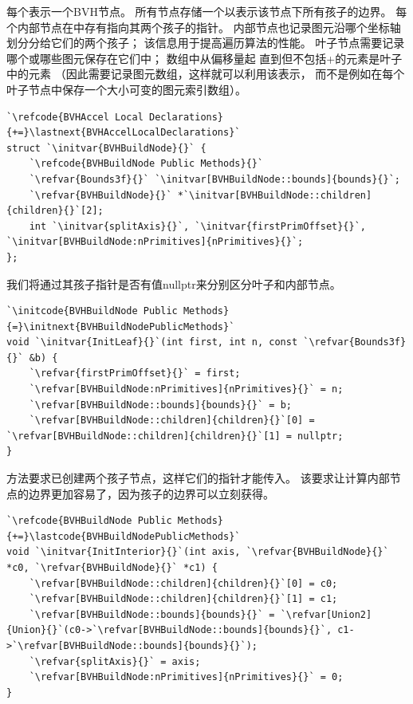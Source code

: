 每个表示一个BVH节点。
所有节点存储一个以表示该节点下所有孩子的边界。
每个内部节点在中存有指向其两个孩子的指针。
内部节点也记录图元沿哪个坐标轴划分分给它们的两个孩子；
该信息用于提高遍历算法的性能。
叶子节点需要记录哪个或哪些图元保存在它们中；
数组中从偏移量起
直到但不包括{\ttfamily{}+}的元素是叶子中的元素
（因此需要记录图元数组，这样就可以利用该表示，
而不是例如在每个叶子节点中保存一个大小可变的图元索引数组）。
\begin{lstlisting}
`\refcode{BVHAccel Local Declarations}{+=}\lastnext{BVHAccelLocalDeclarations}`
struct `\initvar{BVHBuildNode}{}` {
    `\refcode{BVHBuildNode Public Methods}{}`
    `\refvar{Bounds3f}{}` `\initvar[BVHBuildNode::bounds]{bounds}{}`;
    `\refvar{BVHBuildNode}{}` *`\initvar[BVHBuildNode::children]{children}{}`[2];
    int `\initvar{splitAxis}{}`, `\initvar{firstPrimOffset}{}`, `\initvar[BVHBuildNode:nPrimitives]{nPrimitives}{}`;
};
\end{lstlisting}

我们将通过其孩子指针是否有值{\ttfamily nullptr}来分别区分叶子和内部节点。
\begin{lstlisting}
`\initcode{BVHBuildNode Public Methods}{=}\initnext{BVHBuildNodePublicMethods}`
void `\initvar{InitLeaf}{}`(int first, int n, const `\refvar{Bounds3f}{}` &b) {
    `\refvar{firstPrimOffset}{}` = first;
    `\refvar[BVHBuildNode:nPrimitives]{nPrimitives}{}` = n;
    `\refvar[BVHBuildNode::bounds]{bounds}{}` = b;
    `\refvar[BVHBuildNode::children]{children}{}`[0] = `\refvar[BVHBuildNode::children]{children}{}`[1] = nullptr;
}
\end{lstlisting}

方法要求已创建两个孩子节点，这样它们的指针才能传入。
该要求让计算内部节点的边界更加容易了，因为孩子的边界可以立刻获得。
\begin{lstlisting}
`\refcode{BVHBuildNode Public Methods}{+=}\lastcode{BVHBuildNodePublicMethods}`
void `\initvar{InitInterior}{}`(int axis, `\refvar{BVHBuildNode}{}` *c0, `\refvar{BVHBuildNode}{}` *c1) {
    `\refvar[BVHBuildNode::children]{children}{}`[0] = c0;
    `\refvar[BVHBuildNode::children]{children}{}`[1] = c1;
    `\refvar[BVHBuildNode::bounds]{bounds}{}` = `\refvar[Union2]{Union}{}`(c0->`\refvar[BVHBuildNode::bounds]{bounds}{}`, c1->`\refvar[BVHBuildNode::bounds]{bounds}{}`);
    `\refvar{splitAxis}{}` = axis;
    `\refvar[BVHBuildNode:nPrimitives]{nPrimitives}{}` = 0;
}
\end{lstlisting}

